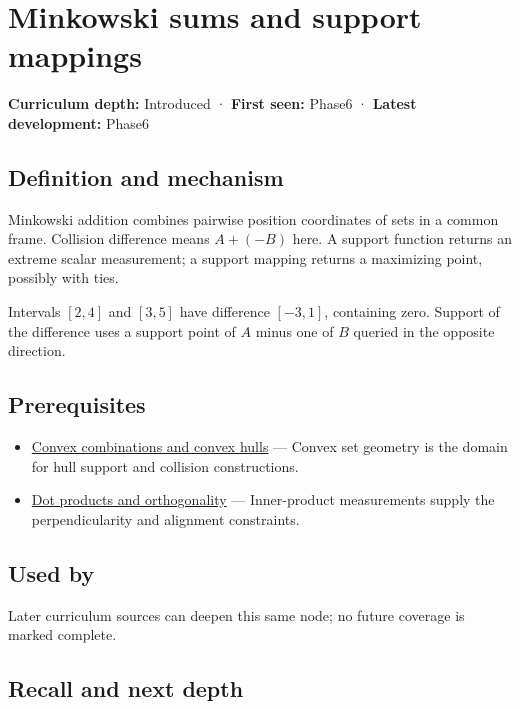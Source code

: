 \hypertarget{appendix-215ac7099a82}{}\label{referencestart:appendix-215ac7099a82}
\section{Minkowski sums and support mappings}\label{appendix-215ac7099a82-minkowski-sums-and-support-mappings}

\textbf{Curriculum depth:} Introduced · \textbf{First seen:} Phase6 · \textbf{Latest development:} Phase6

\subsection{Definition and mechanism}\label{appendix-215ac7099a82-definition-and-mechanism}

Minkowski addition combines pairwise position coordinates of sets in a common frame. Collision difference means \(A+(-B)\) here. A support function returns an extreme scalar measurement; a support mapping returns a maximizing point, possibly with ties.

Intervals \([2,4]\) and \([3,5]\) have difference \([-3,1]\), containing zero. Support of the difference uses a support point of \(A\) minus one of \(B\) queried in the opposite direction.

\subsection{Prerequisites}\label{appendix-215ac7099a82-prerequisites}

\begin{itemize}
\tightlist
\item
  \hyperref[appendix-0026ec42c9d5]{Convex combinations and convex hulls} --- Convex set geometry is the domain for hull support and collision constructions.
\item
  \hyperref[appendix-8bc4e8fc547c]{Dot products and orthogonality} --- Inner-product measurements supply the perpendicularity and alignment constraints.
\end{itemize}

\subsection{Used by}\label{appendix-215ac7099a82-used-by}

Later curriculum sources can deepen this same node; no future coverage is marked complete.

\subsection{Recall and next depth}\label{appendix-215ac7099a82-recall-and-next-depth}


